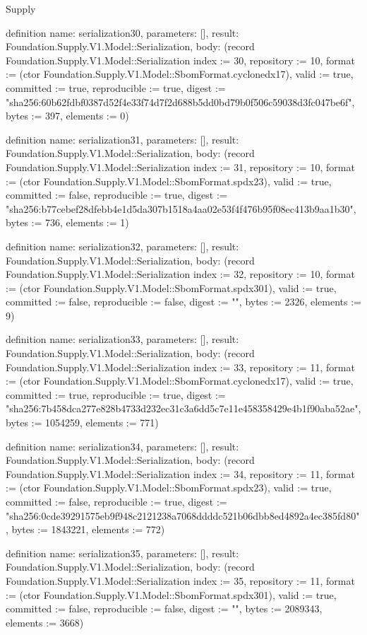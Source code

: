 \begin{lexlean}{Supply}
\begin{semanticmodule}
definition{
  name: serialization30,
  parameters: [],
  result: Foundation.Supply.V1.Model::Serialization,
  body: (record Foundation.Supply.V1.Model::Serialization {index := 30, repository := 10, format := (ctor Foundation.Supply.V1.Model::SbomFormat.cyclonedx17), valid := true, committed := true, reproducible := true, digest := "sha256:60b62fdbf0387d52f4e33f74d7f2d688b5dd0bd79b0f506c59038d3fc047be6f", bytes := 397, elements := 0})
}

definition{
  name: serialization31,
  parameters: [],
  result: Foundation.Supply.V1.Model::Serialization,
  body: (record Foundation.Supply.V1.Model::Serialization {index := 31, repository := 10, format := (ctor Foundation.Supply.V1.Model::SbomFormat.spdx23), valid := true, committed := false, reproducible := true, digest := "sha256:b77cebef28dfebb4e1d5da307b1518a4aa02e53f4f476b95f08ec413b9aa1b30", bytes := 736, elements := 1})
}

definition{
  name: serialization32,
  parameters: [],
  result: Foundation.Supply.V1.Model::Serialization,
  body: (record Foundation.Supply.V1.Model::Serialization {index := 32, repository := 10, format := (ctor Foundation.Supply.V1.Model::SbomFormat.spdx301), valid := true, committed := false, reproducible := false, digest := "", bytes := 2326, elements := 9})
}

definition{
  name: serialization33,
  parameters: [],
  result: Foundation.Supply.V1.Model::Serialization,
  body: (record Foundation.Supply.V1.Model::Serialization {index := 33, repository := 11, format := (ctor Foundation.Supply.V1.Model::SbomFormat.cyclonedx17), valid := true, committed := true, reproducible := true, digest := "sha256:7b458dca277e828b4733d232ec31c3a6dd5c7e11e458358429e4b1f90aba52ae", bytes := 1054259, elements := 771})
}

definition{
  name: serialization34,
  parameters: [],
  result: Foundation.Supply.V1.Model::Serialization,
  body: (record Foundation.Supply.V1.Model::Serialization {index := 34, repository := 11, format := (ctor Foundation.Supply.V1.Model::SbomFormat.spdx23), valid := true, committed := false, reproducible := true, digest := "sha256:0cde39291575eb9f948c2121238a7068ddddc521b06dbb8ed4892a4ec385fd80", bytes := 1843221, elements := 772})
}

definition{
  name: serialization35,
  parameters: [],
  result: Foundation.Supply.V1.Model::Serialization,
  body: (record Foundation.Supply.V1.Model::Serialization {index := 35, repository := 11, format := (ctor Foundation.Supply.V1.Model::SbomFormat.spdx301), valid := true, committed := false, reproducible := false, digest := "", bytes := 2089343, elements := 3668})
}


\end{semanticmodule}
\end{lexlean}
